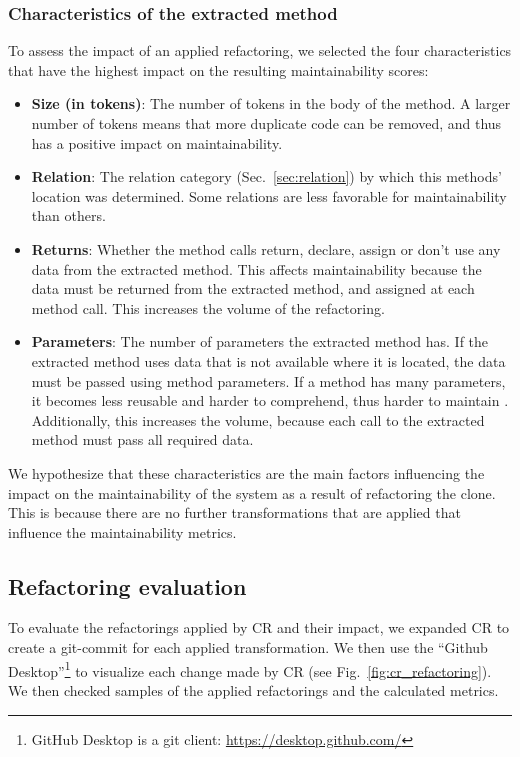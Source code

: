 \documentclass[sigconf,review,anonymous]{acmart}
\begin{document}
\subsubsection{Characteristics of the extracted method}\label{sec:characteristics}
To assess the impact of an applied refactoring, we selected the four characteristics that have the highest impact on the resulting maintainability scores:
\begin{itemize}
\item \textbf{Size (in tokens)}: The number of tokens in the body of the method. A larger number of tokens means that more duplicate code can be removed, and thus has a positive impact on maintainability.
\item \textbf{Relation}: The relation category (Sec.~\ref{sec:relation}) by which this methods' location was determined. Some relations are less favorable for maintainability than others.
\item \textbf{Returns}: Whether the method calls return, declare, assign or don't use any data from the extracted method. This affects maintainability because the data must be returned from the extracted method, and assigned at each method call. This increases the volume of the refactoring.
\item \textbf{Parameters}: The number of parameters the extracted method has. If the extracted method uses data that is not available where it is located, the data must be passed using method parameters. If a method has many parameters, it becomes less reusable and harder to comprehend, thus harder to maintain \cite{heitlager2007practical}. Additionally, this increases the volume, because each call to the extracted method must pass all required data.
\end{itemize}
We hypothesize that these characteristics are the main factors influencing the impact on the maintainability of the system as a result of refactoring the clone. This is because there are no further transformations that are applied that influence the maintainability metrics.

\subsection{Refactoring evaluation}
To evaluate the refactorings applied by CR and their impact, we expanded CR to create a git-commit for each applied transformation. We then use the ``Github Desktop''\footnote{GitHub Desktop is a git client: \url{https://desktop.github.com/}} to visualize each change made by CR (see Fig.~\ref{fig:cr_refactoring}). We then checked samples of the applied refactorings and the calculated metrics.
\end{document}
